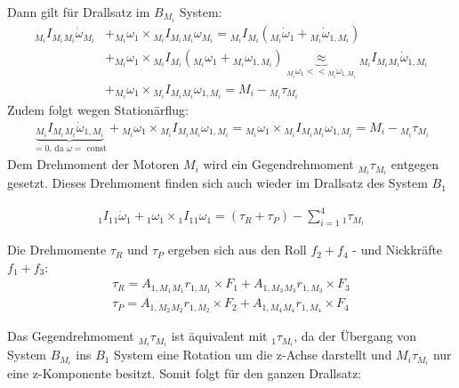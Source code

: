 Dann gilt für Drallsatz im $B_{M_i}$ System: 
\begin{align}
    {_{M_i} I_{M_i}} {_{M_i} \dot{\omega}_{M_i}} &+ {_{M_i} {\omega}_{1}} \times {_{M_i} I_{M_i}} {_{M_i} {\omega}_{M_i}} = {_{M_i} I_{M_i}} \left({_{M_i} \dot{\omega}_{1}} + {_{M_i} \dot{\omega}_{1, M_i}}\right) \\
    &+ {_{M_i} {\omega}_{1}} \times {_{M_i} I_{M_i}} \left({_{M_i} {\omega}_{1}} + {_{M_i} {\omega}_{1, M_i}} \right) \underbrace{\approx}_{{_{M_i} {\omega}_{1}} << {_{M_i} {\omega}_{1, M_i}}} {_{M_i} I_{M_i}} {_{M_i} \dot{\omega}_{1,M_i}} \\
    &+ {_{M_i} {\omega}_{1}} \times {_{M_i} I_{M_i}} {_{M_i} {\omega}_{1, M_i}} = M_i - {_{M_i} \tau_{M_i}}
\end{align}
Zudem folgt wegen Stationärflug:
\begin{align}
    \underbrace{{_{M_i} I_{M_i}} {_{M_i} \dot{\omega}_{1, M_i}}}_{=0\text{, da }\omega =\text{ const}} + {_{M_i} {\omega}_{1}} \times {_{M_i} I_{M_i}} {_{M_i} {\omega}_{1, M_i}} = {_{M_i} {\omega}_{1}} \times {_{M_i} I_{M_i}} {_{M_i} {\omega}_{1, M_i}} =  M_i - {_{M_i} \tau_{M_i}} 
\end{align}
Dem Drehmoment der Motoren $M_i$ wird ein Gegendrehmoment ${_{M_i}\tau_{M_i}}$ entgegen gesetzt. Dieses Drehmoment finden sich auch wieder im Drallsatz des System $B_{1}$

\begin{align}
    {_{1} I_{1}} {_{1} \dot{\omega}_{1}} + {_{1} {\omega}_{1}} \times {_{1} I_{1}} {_{1} {\omega}_{1}} = (\tau_{R} + \tau_{P}) -\sum_{i = 1}^{4} {_{1} \tau_{M_i}} 
\end{align}

Die Drehmomente $\tau_R$ und $\tau_P$ ergeben sich aus den Roll $f_2 + f_4$ - und Nickkräfte $f_1 + f_3$: 
\begin{align}
    \tau_R = A_{1, M_1} {_{M_1}r_{1, M_1}} \times F_1  +  A_{1, M_3} {_{M_3}r_{1, M_3}} \times F_3 \\
    \tau_P = A_{1, M_2} {_{M_2}r_{1, M_2}} \times F_2  +  A_{1, M_4} {_{M_4}r_{1, M_4}} \times F_4
\end{align}

Das Gegendrehmoment ${_{M_i} \tau_{M_i}}$ ist äquivalent mit ${_{1} \tau_{M_i}}$, da der Übergang von System $B_{M_i}$ ins $B_{1}$ System eine Rotation um die z-Achse darstellt und ${{M_i} \tau_{M_i}}$ nur eine z-Komponente besitzt. Somit folgt für den ganzen Drallsatz:

